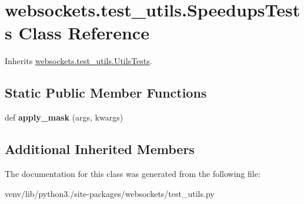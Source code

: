 \hypertarget{classwebsockets_1_1test__utils_1_1_speedups_tests}{}\section{websockets.\+test\+\_\+utils.\+Speedups\+Tests Class Reference}
\label{classwebsockets_1_1test__utils_1_1_speedups_tests}


Inherits \hyperlink{classwebsockets_1_1test__utils_1_1_utils_tests}{websockets.\+test\+\_\+utils.\+Utils\+Tests}.

\subsection*{Static Public Member Functions}
\begin{DoxyCompactItemize}
\item 
\mbox{\label{classwebsockets_1_1test__utils_1_1_speedups_tests_a48fdac5c6e10ad3d17ecbfa75a7b4a54}} 
def {\bfseries apply\+\_\+mask} (args, kwargs)
\end{DoxyCompactItemize}
\subsection*{Additional Inherited Members}


The documentation for this class was generated from the following file\+:\begin{DoxyCompactItemize}
\item 
venv/lib/python3./site-\/packages/websockets/test\+\_\+utils.\+py\end{DoxyCompactItemize}
